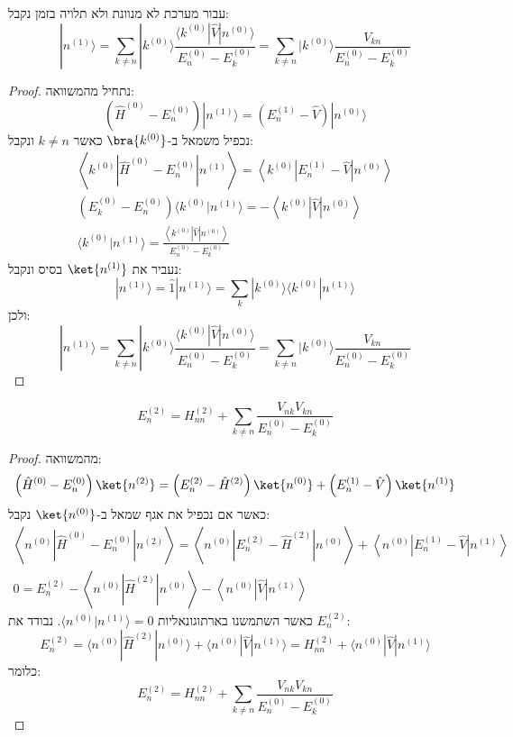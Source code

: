 \documentclass{tstextbook}
\begin{document}
\begin{proposition}
עבור מערכת לא מנוונת ולא תלויה בזמן נקבל:
$$|n^{(1)}\rangle=\sum_{k\neq n}|k^{(0)}\rangle\frac{\langle k^{(0)}|\hat{V}|n^{(0)}\rangle}{E_{n}^{(0)}-E_{k}^{(0)}}=\sum_{k\neq n}|k^{(0)}\rangle\frac{V_{k n}}{E_{n}^{(0)}-E_{k}^{(0)}}$$

\end{proposition}
\begin{proof}
נתחיל מהמשוואה:
$$(\hat{H}^{(0)}-E_{n}^{(0)})|n^{(1)}\rangle=(E_{n}^{(1)}-\hat{V})|n^{(0)}\rangle$$
נכפיל משמאל ב-\(\bra{k^{(0)}}\) כאשר \(k\neq n\) ונקבל:
\begin{gather*}{{\left\langle  k^{(0)}|\hat{H}^{(0)}-E_{n}^{(0)}|n^{(1)} \right\rangle}}={{\left\langle  k^{(0)}|E_{n}^{(1)}-\hat{V}|n^{(0)} \right\rangle}}\\ {{(E_{k}^{(0)}-E_{n}^{(0)})\langle k^{(0)}|n^{(1)}\rangle}}={{-\left\langle  k^{(0)}|\hat{V}|n^{(0)} \right\rangle}}\\{{\langle k^{(0)}|n^{(1)}\rangle}}={{\frac{\left\langle  k^{(0)}|\hat{V}|n^{(0)} \right\rangle}{E_{n}^{(0)}-E_{k}^{(0)}}}}
\end{gather*}
נעביר את \(\ket{n^{(1)}}\) בסיס ונקבל:
$$|n^{(1)}\rangle=\hat{1}|n^{(1)}\rangle=\sum_{k}|k^{(0)}\rangle\langle k^{(0)}|n^{(1)}\rangle$$
ולכן:
$$|n^{(1)}\rangle=\sum_{k\neq n}|k^{(0)}\rangle\frac{\langle k^{(0)}|\hat{V}|n^{(0)}\rangle}{E_{n}^{(0)}-E_{k}^{(0)}}=\sum_{k\neq n}|k^{(0)}\rangle\frac{V_{k n}}{E_{n}^{(0)}-E_{k}^{(0)}}$$

\end{proof}
\begin{proposition}
$$E_{n}^{(2)}=H_{n n}^{(2)}+\sum_{k\neq n}\frac{V_{n k}V_{k n}}{E_{n}^{(0)}-E_{k}^{(0)}}$$

\end{proposition}
\begin{proof}
מהמשוואה:
$${\left( \hat{H}^{(0)}-E_{n}^{(0)} \right)\ket{n^{(2)}} =\left( E_{n}^{(2)}-\hat{H}^{(2)} \right)\ket{n^{(0)}} +\left( E_{n}^{(1)}-\hat{V} \right)\ket{n^{(1)}} }$$
כאשר אם נכפיל את אגף שמאל ב-\(\ket{n^{(0)}}\) נקבל:
\begin{gather*}\left\langle  n^{(0)}|\hat{H}^{(0)}-E_{n}^{(0)}|n^{(2)} \right\rangle=\left\langle  n^{(0)}|E_{n}^{(2)}-\hat{H}^{(2)}|n^{(0)} \right\rangle+\left\langle  n^{(0)}|E_{n}^{(1)}-\hat{V}|n^{(1)} \right\rangle\\ 0={{E_{n}^{(2)}-\left\langle  n^{(0)}|\hat{H}^{(2)}|n^{(0)} \right\rangle-\left\langle  n^{(0)}|\hat{V}|n^{(1)} \right\rangle}}
\end{gather*}
כאשר השתמשנו בארתוגונאליות \(\langle n^{(0)}|n^{(1)} \rangle=0\). נבודד את \(E_{n}^{(2)}\):
$$E_{n}^{(2)}=\langle n^{(0)}|\hat{H}^{(2)}|n^{(0)}\rangle+\langle n^{(0)}|\hat{V}|n^{(1)}\rangle=H_{n n}^{(2)}+\langle n^{(0)}|\hat{V}|n^{(1)}\rangle$$
כלומר:
$$E_{n}^{(2)}=H_{n n}^{(2)}+\sum_{k\neq n}\frac{V_{n k}V_{k n}}{E_{n}^{(0)}-E_{k}^{(0)}}$$

\end{proof}
\end{document}
